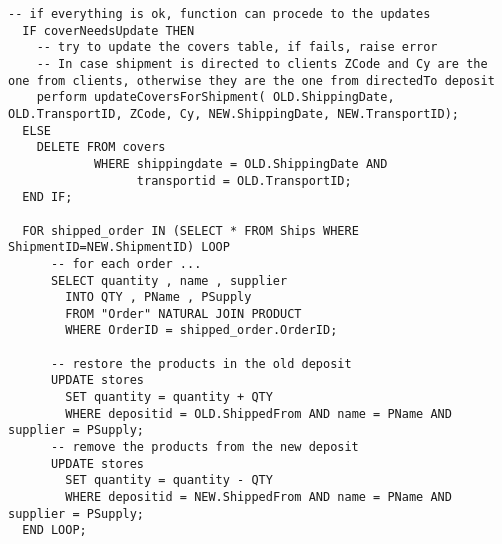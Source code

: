 \begin{lstlisting}[caption={Sezione di aggiornamento finale}]
  -- if everything is ok, function can procede to the updates
  IF coverNeedsUpdate THEN
    -- try to update the covers table, if fails, raise error
    -- In case shipment is directed to clients ZCode and Cy are the one from clients, otherwise they are the one from directedTo deposit
    perform updateCoversForShipment( OLD.ShippingDate, OLD.TransportID, ZCode, Cy, NEW.ShippingDate, NEW.TransportID);
  ELSE 
    DELETE FROM covers 
            WHERE shippingdate = OLD.ShippingDate AND 
                  transportid = OLD.TransportID;
  END IF;

  FOR shipped_order IN (SELECT * FROM Ships WHERE ShipmentID=NEW.ShipmentID) LOOP
      -- for each order ...
      SELECT quantity , name , supplier 
        INTO QTY , PName , PSupply
        FROM "Order" NATURAL JOIN PRODUCT
        WHERE OrderID = shipped_order.OrderID;

      -- restore the products in the old deposit
      UPDATE stores
        SET quantity = quantity + QTY
        WHERE depositid = OLD.ShippedFrom AND name = PName AND supplier = PSupply;
      -- remove the products from the new deposit
      UPDATE stores
        SET quantity = quantity - QTY
        WHERE depositid = NEW.ShippedFrom AND name = PName AND supplier = PSupply;
  END LOOP;
\end{lstlisting}
\newpage
